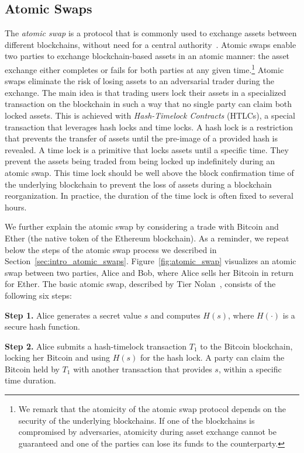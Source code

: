 \subsection{Atomic Swaps}
The \emph{atomic swap} is a protocol that is commonly used to exchange assets between different blockchains, without need for a central authority~\cite{herlihy2018atomic}.
Atomic swaps enable two parties to exchange blockchain-based assets in an atomic manner: the asset exchange either completes or fails for both parties at any given time.\footnote{We remark that the atomicity of the atomic swap protocol depends on the security of the underlying blockchains. If one of the blockchains is compromised by adversaries, atomicity during asset exchange cannot be guaranteed and one of the parties can lose its funds to the counterparty.}
Atomic swaps eliminate the risk of losing assets to an adversarial trader during the exchange.
The main idea is that trading users lock their assets in a specialized transaction on the blockchain in such a way that no single party can claim both locked assets.
This is achieved with \emph{Hash-Timelock Contracts} (HTLCs), a special transaction that leverages hash locks and time locks.
A hash lock is a restriction that prevents the transfer of assets until the pre-image of a provided hash is revealed.
A time lock is a primitive that locks assets until a specific time.
They prevent the assets being traded from being locked up indefinitely during an atomic swap.
This time lock should be well above the block confirmation time of the underlying blockchain to prevent the loss of assets during a blockchain reorganization.
In practice, the duration of the time lock is often fixed to several hours.

We further explain the atomic swap by considering a trade with Bitcoin and Ether (the native token of the Ethereum blockchain).
As a reminder, we repeat below the steps of the atomic swap process we described in Section~\ref{sec:intro_atomic_swaps}.
Figure~\ref{fig:atomic_swap} visualizes an atomic swap between two parties, Alice and Bob, where Alice sells her Bitcoin in return for Ether.
The basic atomic swap, described by Tier Nolan~\cite{nolan2016atomic}, consists of the following six steps:

\textbf{Step 1.} Alice generates a secret value $ s $ and computes $ H(s) $, where $ H(\cdot) $ is a secure hash function.

\textbf{Step 2.} Alice submits a hash-timelock transaction $ T_1 $ to the Bitcoin blockchain, locking her Bitcoin and using $ H(s) $ for the hash lock. A party can claim the Bitcoin held by $ T_1 $ with another transaction that provides $ s $, within a specific time duration.

